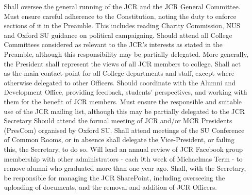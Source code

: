 Shall oversee the general running of the JCR and the JCR General Committee.
Must ensure careful adherence to the Constitution, noting the duty to enforce sections of it in the Preamble. This includes reading Charity Commission, NUS and Oxford SU guidance on political campaigning.
Should attend all College Committees considered as relevant to the JCR's interests as stated in the Preamble, although this responsibility may be partially delegated. More generally, the President shall represent the views of all JCR members to college.
Shall act as the main contact point for all College departments and staff, except where otherwise delegated to other Officers.
Should coordinate with the Alumni and Development Office, providing feedback, students' perspectives, and working with them for the benefit of JCR members.
Must ensure the responsible and suitable use of the JCR mailing list, although this may be partially delegated to the JCR Secretary
Should attend the formal meeting of JCR and/or MCR Presidents (PresCom) organised by Oxford SU.
Shall attend meetings of the SU Conference of Common Rooms, or in absence shall delegate the Vice-President, or failing this, the Secretary, to do so.
Will lead an annual review of JCR Facebook group membership with other administrators - each 0th week of Michaelmas Term - to remove alumni who graduated more than one year ago.
Shall, with the Secretary, be responsible for managing the JCR SharePoint, including overseeing the uploading of documents, and the removal and addition of JCR Officers.
